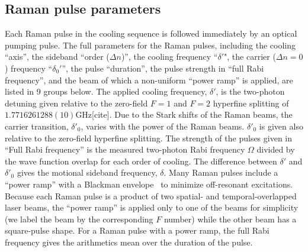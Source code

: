 \documentclass[aps,secnumarabic,amsmath,amssymb]{revtex4}
\begin{document}
\subsection{Raman pulse parameters}
Each Raman pulse in the cooling sequence is followed immediately by an optical pumping
pulse.
The full parameters  for the Raman pulses, including the cooling ``axis'', the sideband ``order ($\Delta n$)'', the cooling frequency ``$\delta '$", the carrier ($\Delta n=0$) frequency ``$\delta_0'$'', the pulse ``duration'', the pulse strength in ``full Rabi frequency'', and the beam of which a non-uniform ``power ramp'' is applied,   are  listed in 9 groups below.
The applied cooling frequency, $\delta'$,  is the two-photon detuning given relative to the zero-field $F=1$ and $F=2$ hyperfine splitting
of $1.7716261288(10)$GHz[cite].
Due to the Stark shifts of the Raman beams, the carrier  transition, $\delta'_0$, varies with the power of the Raman beams. $\delta'_0$ is given also relative to the zero-field  hyperfine splitting.
The strength of the pulses given in ``Full Rabi frequency'' is the measured two-photon Rabi frequency $\Omega$ divided by the wave function overlap for each order of cooling. The difference between $\delta'$ and $\delta'_0$ gives the motional sideband frequency, $\delta$.
Many Raman pulses include a ``power ramp'' with a Blackman envelope~\cite{Kasevich1992} to minimize off-resonant excitations.
Because each Raman pulse is a product of two spatial- and temporal-overlapped laser beams, the ``power ramp'' is applied only to one of the beams for simplicity (we label the beam by the corresponding $F$ number) while the other beam has  a square-pulse shape.
For a Raman pulse with a power ramp,
the full Rabi frequency gives the arithmetics mean over the duration of the pulse.

\newpage
\end{document}
